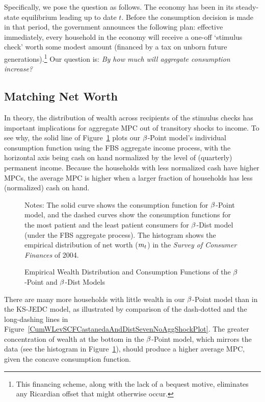 \documentclass[12pt,titlepage]{econtex}
\begin{document}
Specifically, we pose the question as follows.  The economy has been
in its steady-state equilibrium leading up to date $t$.  Before the
consumption decision is made in that period, the government announces
the following plan: effective immediately, every household in the
economy will receive a one-off `stimulus check' worth some modest
amount (financed by a tax on unborn future
generations).\footnote{This financing scheme, along with the lack of a
  bequest motive, eliminates any Ricardian offset that might otherwise
  occur.} Our question is: \emph{By how much will aggregate consumption increase?}

\subsection{Matching Net Worth}

In theory, the distribution of wealth across recipients of the stimulus checks has important implications for aggregate MPC out
of transitory shocks to income. To see why, the solid line of Figure~\ref{CFuncDistSevenPointPermAndHistNetWorthPlotFedQuarterly} plots our $\beta$-Point model's individual
consumption function using the FBS aggregate income process, with the
horizontal axis being cash on hand normalized by the level of
(quarterly) permanent income. Because the households with less normalized cash have higher MPCs, the average MPC is higher when a larger fraction of households has less (normalized) cash on hand.

\begin{figure}
\caption{Empirical Wealth Distribution and Consumption Functions of the
$\beta$-Point and $\beta$-Dist Models}
\label{CFuncDistSevenPointPermAndHistNetWorthPlotFedQuarterly}
\footnotesize Notes: The solid curve shows the consumption function
for $\beta$-Point model, and the dashed curves show the consumption functions
for the most patient and the least patient consumers for
$\beta$-Dist model (under the FBS aggregate process). The histogram shows the empirical distribution of
net worth ($m_{t}$) in the \emph{Survey of Consumer Finances} of 2004.
\end{figure}

There are many more households with little wealth in our $\beta$-Point model than in the KS-JEDC model, as illustrated by comparison of the dash-dotted and the long-dashing lines in Figure~\ref{CumWLevSCFCastanedaAndDistSevenNoAggShockPlot}. The greater concentration of wealth at the bottom in the $\beta$-Point model, which mirrors the data (see the histogram in Figure~\ref{CFuncDistSevenPointPermAndHistNetWorthPlotFedQuarterly}), should produce a higher average MPC, given the concave consumption function.
\end{document}
